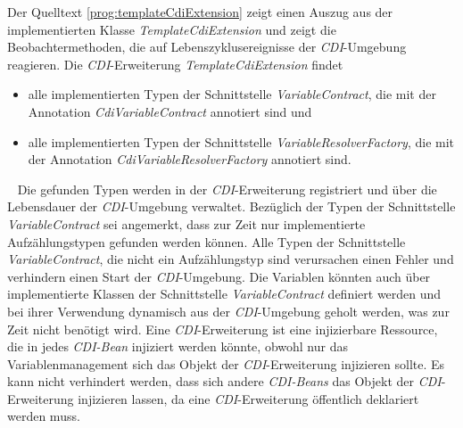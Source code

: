 \newline
\newline
Der Quelltext \ref{prog:templateCdiExtension} zeigt einen Auszug aus der implementierten Klasse \emph{TemplateCdiExtension} und zeigt die Beobachtermethoden, die auf Lebenszyklusereignisse der \emph{CDI}-Umgebung reagieren. Die  \emph{CDI}-Erweiterung \emph{TemplateCdiExtension} findet
\begin{itemize}
	\item alle implementierten Typen der Schnittstelle \emph{VariableContract}, die mit der Annotation \emph{CdiVariableContract} annotiert sind und
	\item alle implementierten Typen der Schnittstelle \emph{VariableResolverFactory}, die mit der Annotation \emph{CdiVariableResolverFactory} annotiert sind.
\end{itemize}
\ \newline
Die gefunden Typen werden in der \emph{CDI}-Erweiterung registriert und über die Lebensdauer der \emph{CDI}-Umgebung verwaltet. Bezüglich der Typen der Schnittstelle \emph{VariableContract} sei angemerkt, dass zur Zeit nur implementierte Aufzählungstypen gefunden werden können. Alle Typen der Schnittstelle \emph{VariableContract}, die nicht ein Aufzählungstyp sind verursachen einen Fehler und verhindern einen Start der \emph{CDI}-Umgebung. Die Variablen könnten auch über implementierte Klassen der Schnittstelle \emph{VariableContract} definiert werden und bei ihrer Verwendung dynamisch aus der \emph{CDI}-Umgebung geholt werden, was zur Zeit nicht benötigt wird.
\newline
\newline
Eine \emph{CDI}-Erweiterung ist eine injizierbare Ressource, die in jedes \emph{CDI-Bean} injiziert werden könnte, obwohl nur das Variablenmanagement sich das Objekt der \emph{CDI}-Erweiterung injizieren sollte. Es kann nicht verhindert werden, dass sich andere \emph{CDI-Beans} das Objekt der \emph{CDI}-Erweiterung injizieren lassen, da eine \emph{CDI}-Erweiterung öffentlich deklariert werden muss.
\newpage

